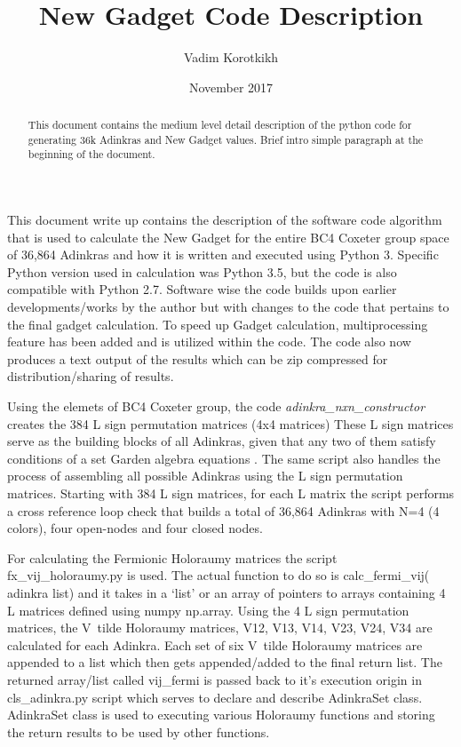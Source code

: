 \documentclass[12pt, letterpaper]{article}
\title{New Gadget Code Description}
\author{Vadim Korotkikh}
\date{November 2017}
\begin{document}
\maketitle

\begin{abstract}
This document contains the medium level detail description of the python code
for generating 36k Adinkras and New Gadget values. Brief intro simple paragraph
at the beginning of the document.
\end{abstract}

This document write up contains the description of the software code algorithm
that is used to calculate the New Gadget for the entire BC4 Coxeter group space
of 36,864 Adinkras and how it is written and executed using Python 3.
Specific Python version used in calculation was Python 3.5, but the code is also
compatible with Python 2.7.
Software wise the code builds upon earlier developments/works by the author but
with changes to the code that pertains to the final gadget calculation.
To speed up Gadget calculation, multiprocessing feature has been added and is
utilized within the code. The code also now produces a text output of the
results which can be zip compressed for distribution/sharing of results. \par


Using the elemets of BC4 Coxeter group, the code \emph{adinkra_nxn_constructor}
creates the 384 L sign permutation matrices (4x4 matrices) These L sign matrices
serve as the building blocks of all Adinkras, given that any two of them satisfy
conditions of a set Garden algebra equations . The same
script also handles the process of assembling all possible Adinkras using the L
sign permutation matrices. Starting with 384 L sign matrices, for each L matrix
the script performs a cross reference loop check that builds a total of 36,864
Adinkras with N=4 (4 colors), four open-nodes and four closed nodes.

For calculating the Fermionic Holoraumy matrices the script fx_vij_holoraumy.py
is used. The actual function to do so is calc_fermi_vij( adinkra list) and it
takes in a ‘list’ or an array of pointers to arrays containing 4 L matrices
defined using numpy np.array. Using the 4 L sign permutation matrices, the
V~tilde Holoraumy matrices, V12, V13, V14, V23, V24, V34 are calculated for each
Adinkra. Each set of six V~tilde Holoraumy matrices are appended to a list which
then gets appended/added to the final return list. The returned array/list called
vij_fermi is passed back to it’s execution origin in cls_adinkra.py script which
serves to declare and describe AdinkraSet class. AdinkraSet class is used to
executing various Holoraumy functions and storing the return results to be used
by other functions.
\end{document}
